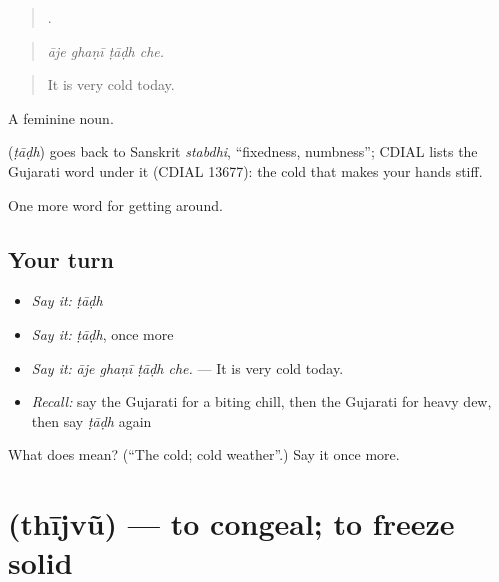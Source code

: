 \begin{quote}
   .
\end{quote}

\begin{quote}
\emph{āje ghaṇī ṭāḍh che.}
\end{quote}

\begin{quote}
It is very cold today.
\end{quote}

A feminine noun.

\begin{cousinweb}
\textbf{} (\emph{ṭāḍh}) goes back to Sanskrit \emph{stabdhi}, \textquotedblleft{}fixedness, numbness\textquotedblright{}; CDIAL lists the Gujarati word under it (CDIAL 13677): the cold that makes your hands stiff.
\end{cousinweb}

\begin{grammarlens}[title={What you've built}]
One more word for getting around.
\end{grammarlens}

\subsection*{Your turn}
\begin{itemize}
\raggedright
  \item \emph{Say it:} \emph{ṭāḍh}
  \item \emph{Say it:} \emph{ṭāḍh}, once more
  \item \emph{Say it:} \emph{āje ghaṇī ṭāḍh che.} — It is very cold today.
  \item \emph{Recall:} say the Gujarati for a biting chill, then the Gujarati for heavy dew, then say \emph{ṭāḍh} again
\end{itemize}

\begin{tcolorbox}[breakable,colback=teal!4,colframe=teal!35!black,title={Before you move on}]
What does  mean? (\textquotedblleft{}The cold; cold weather\textquotedblright{}.) Say it once more.
\end{tcolorbox}
\section[\texorpdfstring{\gu{થીજવું} (thījvũ)}{થીજવું (thījvũ)}]{ (thījvũ) — to congeal; to freeze solid}

\label{lesson:GU-C437-thijvu}



